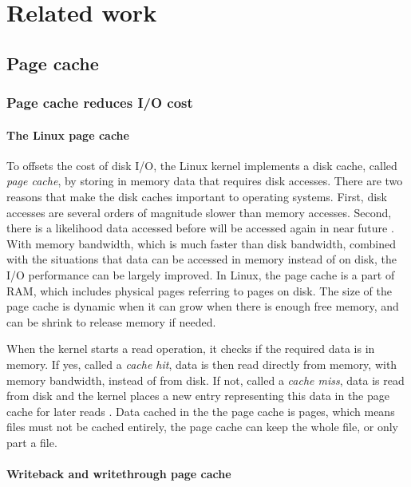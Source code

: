 \chapter{Related work}
\label{relatedwork}

\section{Page cache}

\subsection{Page cache reduces I/O cost}

\subsubsection{The Linux page cache}

To offsets the cost of disk I/O, the Linux kernel implements a disk cache, 
called \textit{page cache}, by storing in memory data that requires 
disk accesses. 
There are two reasons that make the disk caches important to 
operating systems. 
First, disk accesses are several orders of magnitude slower than 
memory accesses. 
Second, there is a likelihood data accessed before will be accessed again 
in near future \cite{linuxdev3rd2010}. 
With memory bandwidth, which is much faster than disk bandwidth, 
combined with the situations that data can be accessed in memory instead 
of on disk, the I/O performance can be largely improved. 
In Linux, the page cache is a part of RAM, which includes physical pages 
referring to pages on disk. 
The size of the page cache is dynamic when it can grow when there is 
enough free memory, and can be shrink to release memory if needed. 

When the kernel starts a read operation, it checks if the required data is 
in memory. If yes, called a \textit{cache hit}, data is then read directly 
from memory, with memory bandwidth, instead of from disk. 
If not, called a \textit{cache miss}, data is read from disk and the kernel 
places a new entry representing this data in the page cache for later reads 
\cite{linuxdev3rd2010}. 
Data cached in the the page cache is pages, which means files must not be 
cached entirely, the page cache can keep the whole file, or only part a file. 

\subsubsection{Writeback and writethrough page cache}

